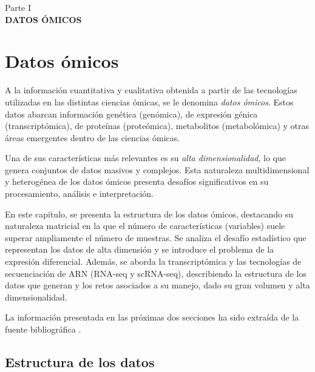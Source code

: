 \newpage
\thispagestyle{empty}
\vspace*{\fill}
\begin{center}
    \large Parte I \\
    \vspace{0.5cm}           
    \LARGE \textbf{DATOS ÓMICOS}
\end{center}
\vspace*{\fill}
\newpage
\setcounter{page}{1}  %

\newpage

\chapter{Datos ómicos}
\setcounter{page}{\value{page}}  %


A la información cuantitativa y cualitativa obtenida a partir de las tecnologías utilizadas
en las distintas ciencias ómicas, se le denomina \textit{datos ómicos}. Estos datos abarcan 
información genética (genómica), de expresión génica (transcriptómica), de proteínas (proteómica),
metabolitos (metabolómica) y otras áreas emergentes dentro de las ciencias ómicas.

Una de sus características más relevantes es su \textit{alta dimensionalidad}, lo que genera conjuntos de datos 
masivos y complejos. Esta naturaleza multidimensional y heterogénea de los datos ómicos presenta 
desafíos significativos en su procesamiento, análisis e interpretación.

En este capítulo, se presenta la estructura de los datos ómicos, destacando su naturaleza matricial en la que 
el número de características (variables) suele superar ampliamente el número de muestras. Se analiza el desafío 
estadístico que representan los datos de alta dimensión y se introduce el problema de la expresión diferencial. 
Además, se aborda la transcriptómica y las tecnologías de secuenciación de ARN (RNA-seq y scRNA-seq), describiendo 
la estructura de los datos que generan y los retos asociados a su manejo, dado su gran volumen y alta dimensionalidad.

La información presentada en las próximas dos secciones ha sido extraída de la fuente bibliográfica \cite{Ayala2023}.

\section{Estructura de los datos}

